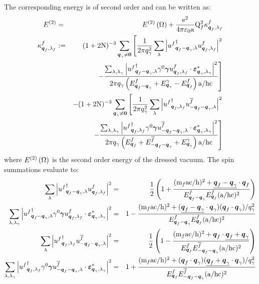 \documentclass[10pt,a4paper,twoside,openany]{book}
\begin{document}
The corresponding energy is of second order and can be written as:
\begin{eqnarray*}
E^{(2)} & = & E^{(2)} \left( \Omega \right) + \frac{\mathrm e^2}{4 \pi \mathrm \varepsilon_0 \mathrm a} \mathrm Q_{f}^2 \kappa^f_{\boldsymbol{q}_f, \lambda_f} \\
\kappa^f_{\boldsymbol{q}_f, \lambda_f} & := & ( 1 + 2 \mathrm N )^{-3} \sum_{\boldsymbol{q}_\gamma \neq \boldsymbol{0}} \left[ \frac 1 {2 \pi q_\gamma^2} \sum_\lambda \left| {u^{f}}^{\dagger}_{{\boldsymbol{q}_f - \boldsymbol{q}_\gamma}, {\lambda}} u^{f}_{{\boldsymbol{q}_f}, {\lambda_f}} \right|^2 \right. \\
&& \left. - \frac {\sum_{\lambda,\lambda_\gamma} \left| {u^{f}}^{\dagger}_{{\boldsymbol{q}_f - \boldsymbol{q}_\gamma}, {\lambda}} \gamma^{0} \boldsymbol{\gamma} u^{f}_{{\boldsymbol{q}_f}, {\lambda_f}} \cdot \boldsymbol{\varepsilon}_{{\boldsymbol{q}_\gamma},{\lambda_\gamma}}^* \right|^2} {2 \pi q_\gamma \left( E^{f}_{\boldsymbol{q}_f - \boldsymbol{q}_\gamma} + E^{\gamma}_{\boldsymbol{q}_\gamma} - E^{f}_{\boldsymbol{q}_f} \right) \mathrm a / \mathrm h \mathrm c} \right] \\
&& - ( 1 + 2 \mathrm N )^{-3} \sum_{\boldsymbol{q}_\gamma \neq \boldsymbol{0}} \left[ \frac 1 {2 \pi q_\gamma^2} \sum_\lambda \left| {u^{f}}^{\dagger}_{{\boldsymbol{q}_f}, {\lambda_f}} u^{\overline{f}}_{{-\boldsymbol{q}_f - \boldsymbol{q}_\gamma}, {\lambda}} \right|^2 \right. \\
&& \left. - \frac {\sum_{\lambda,\lambda_\gamma} \left| {u^{f}}^{\dagger}_{{\boldsymbol{q}_f}, {\lambda_f}} \gamma^{0} \boldsymbol{\gamma} u^{\overline{f}}_{{-\boldsymbol{q}_f - \boldsymbol{q}_\gamma}, {\lambda}} \cdot \boldsymbol{\varepsilon}_{{\boldsymbol{q}_\gamma},{\lambda_\gamma}}^* \right|^2} {2 \pi q_\gamma \left( E^{f}_{\boldsymbol{q}_f} + E^{\overline{f}}_{-\boldsymbol{q}_f - \boldsymbol{q}_\gamma} + E^{\gamma}_{\boldsymbol{q}_\gamma} \right) \mathrm a / \mathrm h \mathrm c} \right]
\end{eqnarray*}
where $E^{(2)} \left( \Omega \right)$ is the second order energy of the dressed vacuum. The spin summations evaluate to:
\begin{eqnarray*}
\sum_{\lambda} \left| {u^{f}}^{\dagger}_{{\boldsymbol{q}_f - \boldsymbol{q}_\gamma}, {\lambda}} u^{f}_{{\boldsymbol{q}_f}, {\lambda_f}} \right|^2 & = & \frac 1 2 \left( 1 + \frac{( \mathrm m_{f} \mathrm a \mathrm c / \mathrm h )^2 + \underline{\boldsymbol{q}_f - \boldsymbol{q}_\gamma} \cdot \boldsymbol{q}_f}{E^{f}_{\boldsymbol{q}_f - \boldsymbol{q}_\gamma} E^{f}_{\boldsymbol{q}_f} ( \mathrm a / \mathrm h \mathrm c )^2} \right) \\
\sum_{\lambda,\lambda_\gamma} \left| {u^{f}}^{\dagger}_{{\boldsymbol{q}_f - \boldsymbol{q}_\gamma}, {\lambda}} \gamma^{0} \boldsymbol{\gamma} u^{f}_{{\boldsymbol{q}_f}, {\lambda_f}} \cdot \boldsymbol{\varepsilon}_{{\boldsymbol{q}_\gamma},{\lambda_\gamma}}^* \right|^2 & = & 1 - \frac{( \mathrm m_{f} \mathrm a \mathrm c / \mathrm h )^2 + ( \underline{\boldsymbol{q}_f - \boldsymbol{q}_\gamma} \cdot \boldsymbol{q}_\gamma ) ( \boldsymbol{q}_f \cdot \boldsymbol{q}_\gamma ) / q_\gamma^2}{E^{f}_{\boldsymbol{q}_f - \boldsymbol{q}_\gamma} E^{f}_{\boldsymbol{q}_f} ( \mathrm a / \mathrm h \mathrm c )^2} \\
\sum_{\lambda} \left| {u^{f}}^{\dagger}_{{\boldsymbol{q}_f}, {\lambda_f}} u^{\overline{f}}_{{-\boldsymbol{q}_f - \boldsymbol{q}_\gamma}, {\lambda}} \right|^2 & = & \frac 1 2 \left( 1 - \frac{( \mathrm m_{f} \mathrm a \mathrm c / \mathrm h )^2 + \boldsymbol{q}_f \cdot \underline{\boldsymbol{q}_f + \boldsymbol{q}_\gamma}}{E^{f}_{\boldsymbol{q}_f} E^{\overline{f}}_{-\boldsymbol{q}_f - \boldsymbol{q}_\gamma} ( \mathrm a / \mathrm h \mathrm c )^2} \right) \\
\sum_{\lambda,\lambda_\gamma} \left| {u^{f}}^{\dagger}_{{\boldsymbol{q}_f}, {\lambda_f}} \gamma^{0} \boldsymbol{\gamma} u^{\overline{f}}_{{-\boldsymbol{q}_f - \boldsymbol{q}_\gamma}, {\lambda}} \cdot \boldsymbol{\varepsilon}_{{\boldsymbol{q}_\gamma},{\lambda_\gamma}}^* \right|^2 & = & 1 + \frac{( \mathrm m_{f} \mathrm a \mathrm c / \mathrm h )^2 + ( \boldsymbol{q}_f \cdot \boldsymbol{q}_\gamma ) ( \underline{\boldsymbol{q}_f + \boldsymbol{q}_\gamma} \cdot \boldsymbol{q}_\gamma ) / q_\gamma^2}{E^{f}_{\boldsymbol{q}_f} E^{\overline{f}}_{- \boldsymbol{q}_f - \boldsymbol{q}_\gamma} ( \mathrm a / \mathrm h \mathrm c )^2}
\end{eqnarray*}
\end{document}
